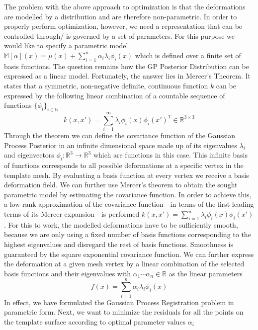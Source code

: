 The problem with the above approach to optimization is that the deformations are modelled by a distribution and are therefore non-parametric. In order to properly perform optimization, however, we need a representation that can be controlled through/ is governed by a set of parameters. For this purpose we would like to specify a parametric model $\mathbb{M}[\alpha](x)=\mu(x)+ \sum^{n}_{i=1} \alpha_{i}\lambda_{i}\phi_{i}(x)$ which is defined over a finite set of basis
functions. The question remains how the GP Posterior Distribution can be expressed as a linear model. Fortunately, the answer lies in Mercer's Theorem. It states that a symmetric, non-negative definite, continuous function $k$ can be expressed by the following linear combination of a countable sequence of functions $\{\phi_{i}\}_{i \in \mathbb{N}}$
\begin{equation}
    k(x,x') = \sum^{\infty}_{i=1}\lambda_{i}\phi_{i}(x)\phi_{i}(x')^{T} \in \mathbb{R}^{3 \times 3}
\end{equation}
Through the theorem we can define the covariance function of the Gaussian Process Posterior in an infinite dimensional space made up of its eigenvalues $\lambda_{i}$ and eigenvectors $\phi_{i}: \mathbb{R}^3 \rightarrow \mathbb{R}^3$ which are functions in this case.
This infinite basis of functions corresponds to all possible deformations at a specific vertex in the template mesh. By evaluating a basis function at every vertex we receive a basis deformation field. We can further use Mercer's theorem to obtain the sought parametric model by estimating the covariance function. In order to achieve this, a low-rank approximation of the covariance function - in terms of the first leading terms of its Mercer expansion - is performed $k(x,x') =
\sum^{n}_{i=1}\lambda_{i}\phi_{i}(x)\phi_{i}(x')$. For this to work, the modelled deformations have to be sufficiently smooth, because we are only using a fixed number of basis functions corresponding to the highest eigenvalues and disregard the rest of basis functions. Smoothness is guaranteed by the square exponential covariance function.
We can further express the deformation at a given mesh vertex by a linear combination of the selected basis functions and their eigenvalues with $\alpha_{1} \cdots \alpha_{n} \in \mathbb{R}$ as the linear parameters
\begin{equation}
f(x) = \sum^{n}_{i=1} \alpha_{i}\lambda_{i}\phi_{i}(x)
\end{equation}
In effect, we have formulated the Gaussian Process Registration problem in parametric form. Next, we want to minimize the residuals for all the points on the template surface according to optimal parameter values $\alpha_{i}$ 
